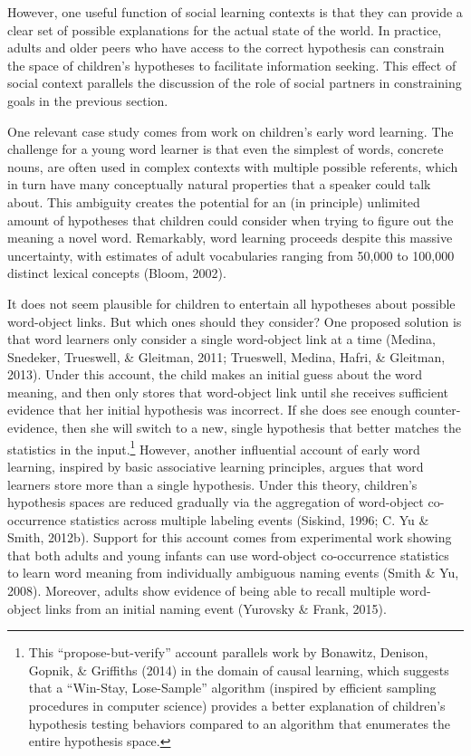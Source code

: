 \documentclass[oneside]{report}
\begin{document}
However, one useful function of social learning contexts is that they
can provide a clear set of possible explanations for the actual state of
the world. In practice, adults and older peers who have access to the
correct hypothesis can constrain the space of children's hypotheses to
facilitate information seeking. This effect of social context parallels
the discussion of the role of social partners in constraining goals in
the previous section.

One relevant case study comes from work on children's early word
learning. The challenge for a young word learner is that even the
simplest of words, concrete nouns, are often used in complex contexts
with multiple possible referents, which in turn have many conceptually
natural properties that a speaker could talk about. This ambiguity
creates the potential for an (in principle) unlimited amount of
hypotheses that children could consider when trying to figure out the
meaning a novel word. Remarkably, word learning proceeds despite this
massive uncertainty, with estimates of adult vocabularies ranging from
50,000 to 100,000 distinct lexical concepts (Bloom, 2002).

It does not seem plausible for children to entertain all hypotheses
about possible word-object links. But which ones should they consider?
One proposed solution is that word learners only consider a single
word-object link at a time (Medina, Snedeker, Trueswell, \& Gleitman,
2011; Trueswell, Medina, Hafri, \& Gleitman, 2013). Under this account,
the child makes an initial guess about the word meaning, and then only
stores that word-object link until she receives sufficient evidence that
her initial hypothesis was incorrect. If she does see enough
counter-evidence, then she will switch to a new, single hypothesis that
better matches the statistics in the input.\footnote{This
  ``propose-but-verify'' account parallels work by Bonawitz, Denison,
  Gopnik, \& Griffiths (2014) in the domain of causal learning, which
  suggests that a ``Win-Stay, Lose-Sample'' algorithm (inspired by
  efficient sampling procedures in computer science) provides a better
  explanation of children's hypothesis testing behaviors compared to an
  algorithm that enumerates the entire hypothesis space.} However,
another influential account of early word learning, inspired by basic
associative learning principles, argues that word learners store more
than a single hypothesis. Under this theory, children's hypothesis
spaces are reduced gradually via the aggregation of word-object
co-occurrence statistics across multiple labeling events (Siskind, 1996;
C. Yu \& Smith, 2012b). Support for this account comes from experimental
work showing that both adults and young infants can use word-object
co-occurrence statistics to learn word meaning from individually
ambiguous naming events (Smith \& Yu, 2008). Moreover, adults show
evidence of being able to recall multiple word-object links from an
initial naming event (Yurovsky \& Frank, 2015).
\end{document}
